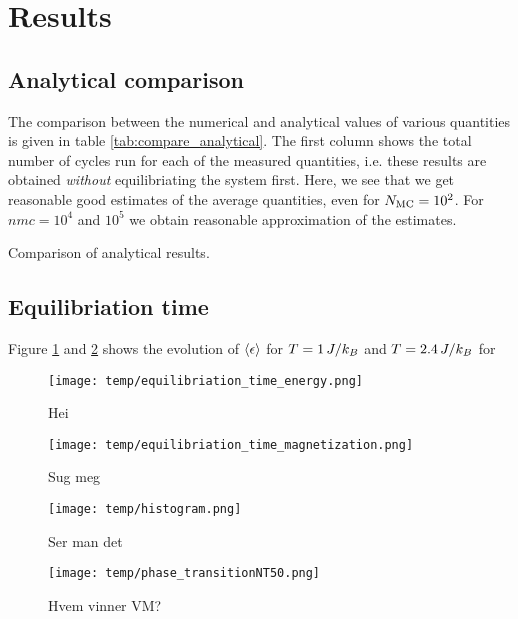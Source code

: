 \section{Results}\label{sec:results}
\subsection{Analytical comparison}\label{subsec_results:analytical}
The comparison between the numerical and analytical values of various quantities is given in table \ref{tab:compare_analytical}. The first column shows the total number of cycles run for each of the measured quantities, i.e. these results are obtained \textit{without} equilibriating the system first. Here, we see that we get reasonable good estimates of the average quantities, even for $N_\mathrm{MC}=10^2$. For $nmc=10^4$ and $10^5$ we obtain reasonable approximation of the estimates.  

\begin{table}[!ht]
    
    \caption{Comparison of analytical results. }
    \label{tab:compare_analytical}
\end{table}


\subsection{Equilibriation time}\label{subsec_results:equilibriation_time}
Figure \ref{fig:equil_energy} and \ref{fig:equil_magn} shows the evolution of $\expval{\epsilon}$ for $T=1\,J/k_B$ and $T=2.4\,J/k_B$ for 
\begin{figure}[!ht]
    \texttt{[image: temp/equilibriation\_time\_energy.png]}
    \caption{Hei}
    \label{fig:equil_energy}
\end{figure}



\begin{figure}[!ht]
    \texttt{[image: temp/equilibriation\_time\_magnetization.png]}
    \caption{Sug meg}
    \label{fig:equil_magn}
\end{figure}


\begin{figure}[!ht]
    \texttt{[image: temp/histogram.png]}
    \caption{Ser man det }
    \label{fig:histogram}
\end{figure}


\begin{figure*}[!ht]
    \texttt{[image: temp/phase\_transitionNT50.png]} 
    \caption{Hvem vinner VM?}
    \label{fig:phase_transition}
\end{figure*} 

